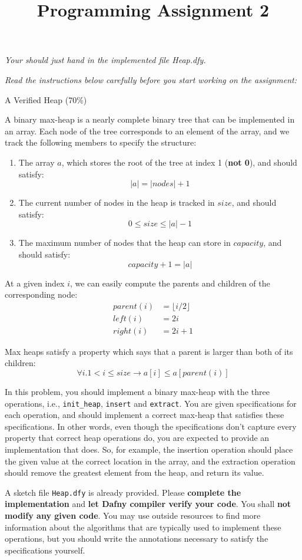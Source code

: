 \documentclass[11pt,a4paper]{article}
\title{Programming Assignment 2}
\let\t\texttt
\begin{document}
\maketitle

\textit{Your should just hand in the implemented file Heap.dfy.}

\textit{Read the instructions below carefully before you start working on the assignment:}

\begin{problem}{A Verified Heap (70\%)}

A binary max-heap is a nearly complete binary tree that can be implemented in an array. Each node of the tree corresponds to an element of the array, and we track the following members to specify the structure:

\begin{enumerate}
	\item The array $a$, which stores the root of the tree at index 1 (\textbf{not 0}), and should satisfy:
	$$|a| = |\mathit{nodes}|+1$$
	\item The current number of nodes in the heap is tracked in $\mathit{size}$, and should satisfy:
	$$0 \le \mathit{size} \le |a| - 1$$
	\item The maximum number of nodes that the heap can store in $\mathit{capacity}$, and should satisfy:
	$$\mathit{capacity}+1 = |a|$$
\end{enumerate}

At a given index $i$, we can easily compute the parents and children of the corresponding node:
\begin{align*}
	\mathit{parent}(i) &= \lfloor i / 2 \rfloor \\
	\mathit{left}(i) &= 2i \\
	\mathit{right}(i) &= 2i + 1
\end{align*}

Max heaps satisfy a property which says that a parent is larger than both of its children:
$$\forall i . 1 < i \le \mathit{size} \rightarrow a[i] \le a[\mathit{parent}(i)]$$

In this problem, you should implement a binary max-heap with the three operations, 
i.e., \t{init\_heap}, \t{insert} and \t{extract}. 
You are given specifications for each operation, 
and should implement a correct max-heap that satisfies these specifications. 
In other words, even though the specifications don't capture every property that correct heap operations do, you are expected to provide an implementation that does. 
So, for example, 
the insertion operation should place the given value at the correct location in the array, 
and the extraction operation should remove the greatest element from the heap, 
and return its value.

A sketch file \t{Heap.dfy} is already provided.
Please \textbf{complete the implementation} and 
\textbf{let Dafny compiler verify your code}.
You shall \textbf{not modify any given code}.
You may use outside resources to find more information about the algorithms that are typically used to implement these operations, 
but you should write the annotations necessary to satisfy the specifications yourself.

\end{problem}
\end{document}
